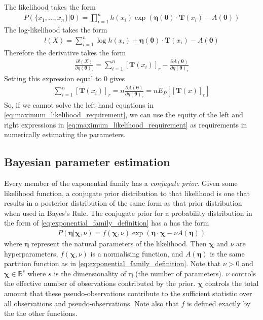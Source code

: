 \documentclass[a4paper,12pt]{article}
\theoremstyle{definition}
\newcommand{\pdiff}[2]{\frac{\partial #1}{\partial #2}} %
\begin{document}
The likelihood takes the form 
\begin{align}\label{eq:exponential_family_likelihood}
  P(\lbrace x_1, \dots, x_n \rbrace | \boldsymbol{\theta}) = \prod_{i=1}^n h(x_i) \exp \left( \boldsymbol{\eta}(\boldsymbol{\theta})\cdot \mathbf{T}(x_i) - A(\boldsymbol{\theta}) \right)
\end{align}
The log-likelihood takes the form
\begin{align}
  l(X) = \sum_{i=1}^n \log h(x_i) + \boldsymbol{\eta}(\boldsymbol{\theta})\cdot \mathbf{T}(x_i) - A(\boldsymbol{\theta})
\end{align}
Therefore the derivative takes the form 
\begin{align}
  \pdiff{l(X)}{\eta (\boldsymbol{\theta})_r} = \sum_{i=1}^n \left[ \mathbf{T}(x_i) \right]_r - \pdiff{A(\boldsymbol{\theta})}{\eta(\boldsymbol{\theta})_r}
\end{align}
Setting this expression equal to $0$ gives 
\begin{align}\label{eq:maximum_likelihood_requirement}
  \sum_{i=1}^n \left[ \mathbf{T}(x_i) \right]_r = n\pdiff{A(\boldsymbol{\theta})}{\eta(\boldsymbol{\theta})_r} = n E_P \left[ [\mathbf{T}(x)]_r \right]
\end{align}
So, if we cannot solve the left hand equations in \ref{eq:maximum_likelihood_requirement}, we can use the equity of the left and right expressions in \ref{eq:maximum_likelihood_requirement} as requirements in numerically estimating the parameters.

\subsection{Bayesian parameter estimation}
Every member of the exponential family has a \textit{conjugate prior}. Given some likelihood function, a conjugate prior distribution to that likelihood is one that results in a posterior distribution of the same form as that prior distribution when used in Bayes's Rule. The conjugate prior for a probability distribution  in the form of \ref{eq:exponential_family_definition} has a has the form 
\begin{align}\label{eq:exponential_family_prior}
  P(\boldsymbol{\eta} | \boldsymbol{\chi}, \nu) = f(\boldsymbol{\chi}, \nu)\exp (\boldsymbol{\eta} \cdot \boldsymbol{\chi} - \nu A(\boldsymbol{\eta}))
\end{align}
where $\boldsymbol{\eta}$ represent the natural parameters of the likelihood. Then $\boldsymbol{\chi}$ and $\nu$ are hyperparameters, $f(\boldsymbol{\chi}, \nu)$ is a normalising function, and $A(\boldsymbol{\eta})$ is the same partition function as in \ref{eq:exponential_family_definition}. Note that $\nu > 0$ and $\boldsymbol{\chi} \in \mathbb{R}^s$ where $s$ is the dimensionality of $\boldsymbol{\eta}$ (the number of parameters). $\nu$ controls the effective number of observations contributed by the prior. $\boldsymbol{\chi}$ controls the total amount that these pseudo-observations contribute to the sufficient statistic over all observations and pseudo-observations. Note also that $f$ is defined exactly by the the other functions.
\end{document}

